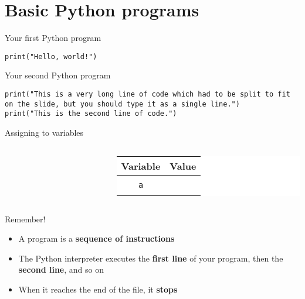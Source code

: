 \newcommand{\codeslide}[2]{
	\begin{columns}
		\begin{column}{0.48\textwidth}
			
		\end{column}
		
		\begin{column}{0.48\textwidth}
			\begin{center}
				\colorbox{white}{
					\color{black}
					\begin{tabular}{|c|c|}
						\hline
						\textbf{Variable} & \textbf{Value} \\\hline
						#2
					\end{tabular}
				}
			\end{center}
		\end{column}
	\end{columns}
}

\newcommand{\trow}[1]{ & \\ \texttt{#1} & \\ & \\\hline}

\part{Basic Python programs}
\frame{\partpage}

\begin{frame}[fragile]{Your first Python program}
\begin{lstlisting}
print("Hello, world!")
\end{lstlisting}
\end{frame}

\begin{frame}[fragile]{Your second Python program}
\begin{lstlisting}
print("This is a very long line of code which had to be split to fit on the slide, but you should type it as a single line.")
print("This is the second line of code.")
\end{lstlisting}
\end{frame}

\begin{frame}{Assigning to variables}
\codeslide{assign0.py}{\trow{a}}
\end{frame}

\begin{frame}{Remember!}
\begin{itemize}
\item A program is a \textbf{sequence of instructions}
\item The Python interpreter executes the \textbf{first line} of your program, then the \textbf{second line},
and so on
\item When it reaches the end of the file, it \textbf{stops}
\end{itemize}
\end{frame}

